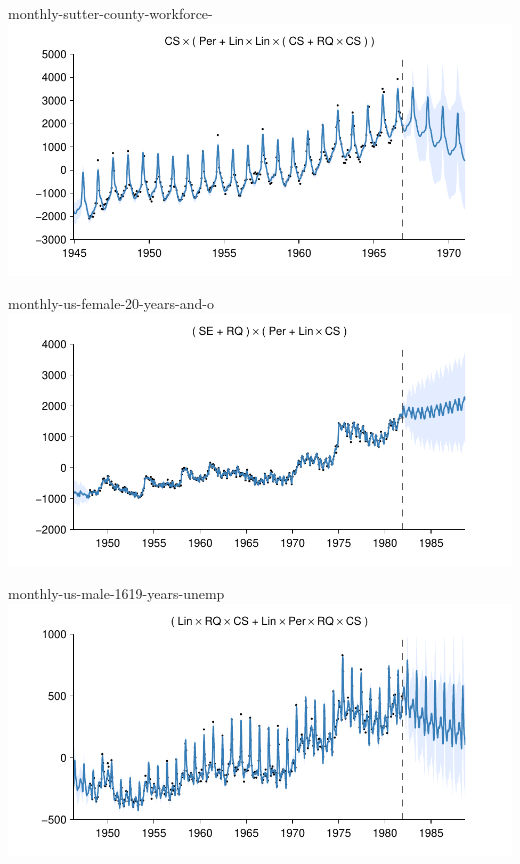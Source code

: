 \begin{frame}{monthly-sutter-county-workforce-}
  \center
  \includegraphics[width=1.0\textwidth]{figures/monthly-sutter-county-workforce-/monthly-sutter-county-workforce-_all}
\end{frame}  

\begin{frame}{monthly-us-female-20-years-and-o}
  \center
  \includegraphics[width=1.0\textwidth]{figures/monthly-us-female-20-years-and-o/monthly-us-female-20-years-and-o_all}
\end{frame}  
    
\begin{frame}{monthly-us-male-1619-years-unemp}
  \center
  \includegraphics[width=1.0\textwidth]{figures/monthly-us-male-1619-years-unemp/monthly-us-male-1619-years-unemp_all}
\end{frame}  

